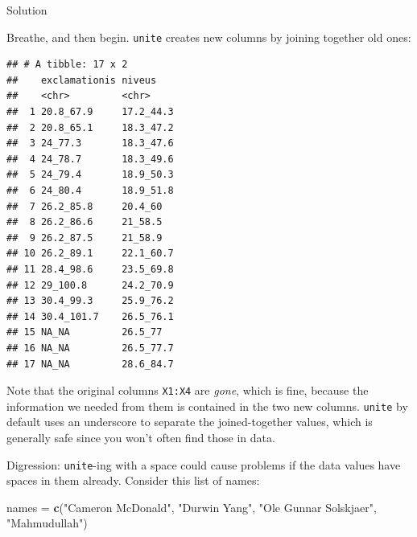 \documentclass[]{tufte-book}
\newenvironment{Shaded}{}{}
\newcommand{\KeywordTok}[1]{\textcolor[rgb]{0.00,0.44,0.13}{\textbf{#1}}}
\newcommand{\NormalTok}[1]{#1}
\newcommand{\OperatorTok}[1]{\textcolor[rgb]{0.40,0.40,0.40}{#1}}
\newcommand{\StringTok}[1]{\textcolor[rgb]{0.25,0.44,0.63}{#1}}
\theoremstyle{definition}
\theoremstyle{definition}
\theoremstyle{definition}
\theoremstyle{remark}
\begin{document}
Solution

Breathe, and then begin. \texttt{unite} creates new columns by joining
together old ones:

\begin{Shaded}
\end{Shaded}

\begin{verbatim}
## # A tibble: 17 x 2
##    exclamationis niveus   
##    <chr>         <chr>    
##  1 20.8_67.9     17.2_44.3
##  2 20.8_65.1     18.3_47.2
##  3 24_77.3       18.3_47.6
##  4 24_78.7       18.3_49.6
##  5 24_79.4       18.9_50.3
##  6 24_80.4       18.9_51.8
##  7 26.2_85.8     20.4_60  
##  8 26.2_86.6     21_58.5  
##  9 26.2_87.5     21_58.9  
## 10 26.2_89.1     22.1_60.7
## 11 28.4_98.6     23.5_69.8
## 12 29_100.8      24.2_70.9
## 13 30.4_99.3     25.9_76.2
## 14 30.4_101.7    26.5_76.1
## 15 NA_NA         26.5_77  
## 16 NA_NA         26.5_77.7
## 17 NA_NA         28.6_84.7
\end{verbatim}

Note that the original columns \texttt{X1:X4} are \emph{gone}, which is
fine, because the information we needed from them is contained in the
two new columns. \texttt{unite} by default uses an underscore to
separate the joined-together values, which is generally safe since you
won't often find those in data.

Digression: \texttt{unite}-ing with a space could cause problems if the
data values have spaces in them already. Consider this list of names:

\begin{Shaded}
\begin{Highlighting}[]
\NormalTok{names =}\StringTok{ }\KeywordTok{c}\NormalTok{(}\StringTok{"Cameron McDonald"}\NormalTok{, }\StringTok{"Durwin Yang"}\NormalTok{, }\StringTok{"Ole Gunnar Solskjaer"}\NormalTok{, }
    \StringTok{"Mahmudullah"}\NormalTok{)}
\end{Highlighting}
\end{Shaded}
\end{document}
